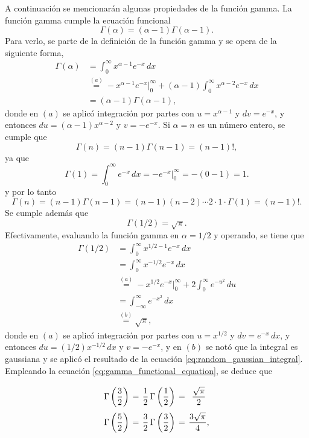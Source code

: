 \documentclass[a4paper]{report}
\begin{document}
A continuación se mencionarán algunas propiedades de la función gamma. La función gamma cumple la ecuación funcional
\begin{equation}\label{eq:gamma_functional_equation}
 \Gamma(\alpha)=(\alpha-1)\Gamma(\alpha-1).
\end{equation}
Para verlo, se parte de la definición de la función gamma y se opera de la siguiente forma, 
\begin{align*}
 \Gamma(\alpha)&=\int_{0}^{\infty}x^{\alpha-1}e^{-x}\,dx\\
   &\overset{(a)}{=}-x^{\alpha-1}e^{-x}\Big|_{0}^{\infty}+(\alpha-1)\int_{0}^{\infty}x^{\alpha-2}e^{-x}\,dx\\
   &=(\alpha-1)\Gamma(\alpha-1),
\end{align*}
donde en \((a)\) se aplicó integración por partes con \(u=x^{\alpha-1}\) y \(dv=e^{-x}\), y entonces \(du=(\alpha-1)x^{\alpha-2}\) y \(v=-e^{-x}\).
Si \(\alpha=n\) es un número entero, se cumple que
\begin{equation}\label{eq:gamma_function_equals_factorial}
 \Gamma(n)=(n-1)\Gamma(n-1)=(n-1)!,
\end{equation}
ya que
\[
 \Gamma(1)=\int_{0}^{\infty}e^{-x}\,dx=-e^{-x}\Big|_{0}^{\infty}=-(0-1)=1.
\]
y por lo tanto
\[
 \Gamma(n)=(n-1)\Gamma(n-1)=(n-1)(n-2)\cdots 2\cdot 1\cdot\Gamma(1)=(n-1)!.
\]
Se cumple además que
\begin{equation}\label{eq:gamma_function_of_one_half}
 \Gamma(1/2)=\sqrt{\pi}.
\end{equation}
Efectivamente, evaluando la función gamma en \(\alpha=1/2\) y operando, se tiene que 
\begin{align*}
 \Gamma(1/2)&=\int_{0}^{\infty}x^{1/2-1}e^{-x}\,dx\\
   &=\int_{0}^{\infty}x^{-1/2}e^{-x}\,dx\\
   &\overset{(a)}{=}-x^{1/2}e^{-x}\Big|_{0}^{\infty}+2\int_{0}^{\infty}e^{-u^2}\,du\\
   &=\int_{-\infty}^{\infty}e^{-x^2}\,dx\\
   &\overset{(b)}{=}\sqrt{\pi},
\end{align*}
donde en \((a)\) se aplicó integración por partes con \(u=x^{1/2}\) y \(dv=e^{-x}\,dx\), y entonces \(du=(1/2)x^{-1/2}\,dx\) y \(v=-e^{-x}\), y en \((b)\) se notó que la integral es gaussiana y se aplicó el resultado de la ecuación \ref{eq:random_gaussian_integral}.
Empleando la ecuación \ref{eq:gamma_functional_equation}, se deduce que
\[\arraycolsep=2pt\def\arraystretch{2.5}
\begin{array}{ccccc}
  \Gamma\left(\dfrac{3}{2}\right)&=&\dfrac{1}{2}\,\Gamma\left(\dfrac{1}{2}\right)&=&\dfrac{\sqrt{\pi}}{2}\\
  \Gamma\left(\dfrac{5}{2}\right)&=&\dfrac{3}{2}\,\Gamma\left(\dfrac{3}{2}\right)&=&\dfrac{3\sqrt{\pi}}{4},
\end{array}
\]
\end{document}
